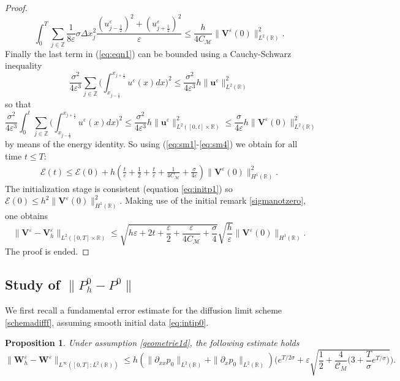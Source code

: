 \documentclass[a4paper,french,english,10pt]{article}
\newcommand\eps{\varepsilon}
\newcommand\V{\mathbf{V}}
\newcommand\W{\mathbf{W}}
\newtheorem{proposition}[theorem]{Proposition}
\begin{document}
\begin{proof}
\begin{equation}
 \int_0^T \underset{j\in \mathbb{Z}}{\sum} \frac{1}{8\eps} \sigma \Delta x_j^2
\frac{(u_{j-\frac12 }^{\eps})^2+(
u_{j+\frac12 }^{\eps})^2}{\eps} \leq  \frac{h}{4C_{\mathcal{M}}} \|\mathbf{V}^{\eps}(0)\|_{L^2(\mathbb{R})}^2.
\end{equation}
Finally the last term in (\ref{eq:eqn1}) can be bounded using a
Cauchy-Schwarz inequality 
$$
\frac{\sigma^2}{4\eps^3} \sum_{j\in
\mathbb{Z}}\bigg( {\int_{x_{j-\frac12}}^{x_{j+\frac12}}} u^{\eps}(x) dx \bigg)^2
\leq 
\frac{\sigma^2}{4\eps^3}
h \|  \mathbf u^\eps  \|^2_{  L^2(\mathbb R) }
$$
so that
\begin{equation} \label{eq:sm4}
\frac{\sigma^2}{4\eps^3} 
\int_0^t 
 \sum_{j\in
\mathbb{Z}}\bigg( {\int_{x_{j-\frac12}}^{x_{j+\frac12}}} u^{\eps}(x) dx \bigg)^2
\leq 
\frac{\sigma^2}{4\eps^3}
h \|  \mathbf u^\eps  \|^2_{  L^2([0,t]\times \mathbb R) }
\leq 
\frac{\sigma}{4\eps}
h  \|\mathbf{V}^{\eps}(0)\|_{L^2(\mathbb{R})}^2
\end{equation}
by means of the energy identity.
 So using (\ref{eq:sm1}-\ref{eq:sm4}) we obtain for all time $t\leq T$:
\begin{eqnarray*}
\mathscr{E}(t) \leq
\mathscr{E}(0)+h
\left( \frac{t}{\eps}+\frac{1}2 + \frac{t}{\eps}+\frac{1}{4C_{\mathcal{M}}}+\frac{\sigma
}{4\eps}\right)\| \V^{\eps}(0) \|_{H^1(\mathbb{R})}^2.
\end{eqnarray*}
The initialization stage is consistent (equation \ref{eq:initp1}) so 
 $\mathscr{E}(0)\leq h^2\| \V^{\eps}(0) \|_{H^1(\mathbb{R})}^2$.
 Making use of the  initial remark \ref{sigmanotzero}, one   obtains 
\begin{equation*}\label{esti1}
\|\V^{\eps}-\V^{\eps}_h \|_{L^2([0,T]\times \mathbb{R})}
\leq \sqrt{h\eps + 2t + \frac{\eps}{2} + \frac{\eps}{4C_{\mathcal{M}}} + \frac{\sigma}{4} } \sqrt{ \frac{h}{\eps}}
\| \V^{\eps}( 0)
\|_{H^1(\mathbb{R})} .
\end{equation*}
The proof is ended.
\end{proof}


\subsection{Study of $\| P_h^0 - P^0  \|$}

We  first 
 recall a fundamental   error estimate \cite{FV}
for the diffusion limit scheme \eqref{schemadifff}, assuming smooth initial data \eqref{eq:intip0}. 
\begin{proposition}\label{ds1d}
Under assumption \ref{geometrie1d}, the following estimate holds
\begin{equation*}
\|\W_h^\eps-\W^\eps\|_{L^{\infty}([0,T];L^2(\mathbb{R}))} \leq h 
\left(  \|\partial_{xx}p_0   \| _{L^2(\mathbb{R})}+
 \|\partial_{x}p_0   \| _{L^2(\mathbb{R})}
\right)  \bigg(  
e^{T/2\sigma} + 
\eps \sqrt{\frac12 + \frac{4}{\mathcal{C}_M}\bigg( 3 + \frac{T}{\sigma}e^{T/\sigma} \bigg) } \bigg).
\end{equation*}
\end{proposition}
\end{document}
